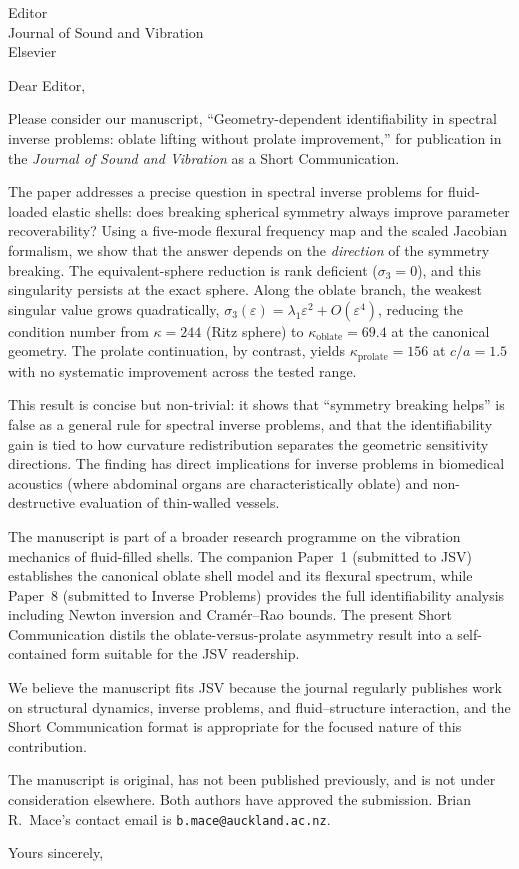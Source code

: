 \documentclass[11pt]{letter}
\date{\today}
\begin{document}
\begin{letter}{Editor\\Journal of Sound and Vibration\\Elsevier}

\opening{Dear Editor,}

\small

Please consider our manuscript, ``Geometry-dependent identifiability in spectral
inverse problems: oblate lifting without prolate improvement,'' for publication
in the \emph{Journal of Sound and Vibration} as a Short Communication.

The paper addresses a precise question in spectral inverse problems for
fluid-loaded elastic shells: does breaking spherical symmetry always improve
parameter recoverability?  Using a five-mode flexural frequency map and the
scaled Jacobian formalism, we show that the answer depends on the
\emph{direction} of the symmetry breaking.  The equivalent-sphere reduction is
rank deficient ($\sigma_3=0$), and this singularity persists at the exact
sphere.  Along the oblate branch, the weakest singular value grows
quadratically, $\sigma_3(\varepsilon)=\lambda_1\varepsilon^2+O(\varepsilon^4)$,
reducing the condition number from $\kappa=244$ (Ritz sphere) to
$\kappa_\mathrm{oblate}=\num{69.4}$ at the canonical geometry.  The prolate
continuation, by contrast, yields $\kappa_\mathrm{prolate}=156$ at $c/a=1.5$
with no systematic improvement across the tested range.

This result is concise but non-trivial: it shows that ``symmetry breaking
helps'' is false as a general rule for spectral inverse problems, and that the
identifiability gain is tied to how curvature redistribution separates the
geometric sensitivity directions.  The finding has direct implications for
inverse problems in biomedical acoustics (where abdominal organs are
characteristically oblate) and non-destructive evaluation of thin-walled
vessels.

The manuscript is part of a broader research programme on the vibration
mechanics of fluid-filled shells.  The companion Paper~1 (submitted to JSV)
establishes the canonical oblate shell model and its flexural spectrum, while
Paper~8 (submitted to Inverse Problems) provides the full identifiability
analysis including Newton inversion and Cram\'er--Rao bounds.  The present Short
Communication distils the oblate-versus-prolate asymmetry result into a
self-contained form suitable for the JSV readership.

We believe the manuscript fits JSV because the journal regularly publishes work
on structural dynamics, inverse problems, and fluid--structure interaction, and
the Short Communication format is appropriate for the focused nature of this
contribution.

The manuscript is original, has not been published previously, and is not under
consideration elsewhere.  Both authors have approved the submission.  Brian R.\
Mace's contact email is \texttt{b.mace@auckland.ac.nz}.

\closing{Yours sincerely,}

\end{letter}
\end{document}
